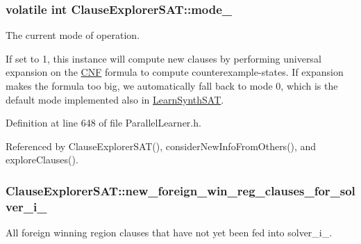 \hypertarget{classClauseExplorerSAT_a974855f554c6016fa7dd291afd76baa4}{
\subsubsection[{mode\-\_\-}]{\setlength{\rightskip}{0pt plus 5cm}volatile int Clause\-Explorer\-S\-A\-T\-::mode\-\_\-}}\label{classClauseExplorerSAT_a974855f554c6016fa7dd291afd76baa4}


The current mode of operation. 

If set to 1, this instance will compute new clauses by performing universal expansion on the \hyperlink{classCNF}{C\-N\-F} formula to compute counterexample-\/states. If expansion makes the formula too big, we automatically fall back to mode 0, which is the default mode implemented also in \hyperlink{classLearnSynthSAT}{Learn\-Synth\-S\-A\-T}. 

Definition at line 648 of file Parallel\-Learner.\-h.



Referenced by Clause\-Explorer\-S\-A\-T(), consider\-New\-Info\-From\-Others(), and explore\-Clauses().

\hypertarget{classClauseExplorerSAT_a70c8edd590d75994ee354d591909cd35}{
\subsubsection[{new\-\_\-foreign\-\_\-win\-\_\-reg\-\_\-clauses\-\_\-for\-\_\-solver\-\_\-i\-\_\-}]{ Clause\-Explorer\-S\-A\-T\-::new\-\_\-foreign\-\_\-win\-\_\-reg\-\_\-clauses\-\_\-for\-\_\-solver\-\_\-i\-\_\-\hspace{0.3cm}{\ttfamily [protected]}}}\label{classClauseExplorerSAT_a70c8edd590d75994ee354d591909cd35}


All foreign winning region clauses that have not yet been fed into solver\-\_\-i\-\_\-. 

